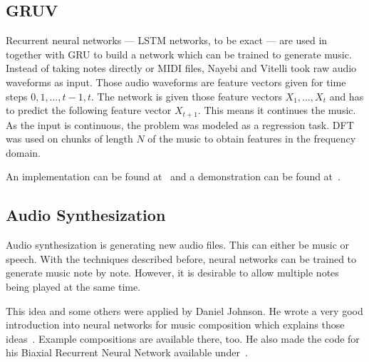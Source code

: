 \subsection{GRUV}

Recurrent neural networks --- \gls{LSTM} networks, to be exact --- are used
in~\cite{nayebigruv} together with \gls{GRU} to build a network which can be
trained to generate music. Instead of taking notes directly or MIDI files,
Nayebi and Vitelli took raw audio waveforms as input. Those audio waveforms are
feature vectors given for time steps $0, 1, \dots, t-1, t$. The network is
given those feature vectors $X_1, \dots, X_t$ and has to predict the following
feature vector $X_{t+1}$. This means it continues the music. As the input is
continuous, the problem was modeled as a regression task. \Gls{DFT} was used on
chunks of length $N$ of the music to obtain features in the frequency domain.

An implementation can be found at~\cite{gruvGitHub} and a demonstration can
be found at~\cite{Vitelli2015}.


\subsection{Audio Synthesization}
Audio synthesization is generating new audio files. This can either be music or
speech. With the techniques described before, neural networks can be trained to
generate music note by note. However, it is desirable to allow multiple notes
being played at the same time.

This idea and some others were applied by Daniel Johnson. He wrote a very good
introduction into neural networks for music composition which explains those
ideas~\cite{Johnson2015}. Example compositions are available there, too. He
also made the code for his Biaxial Recurrent Neural Network available
under~\cite{Johnson2015a}.





